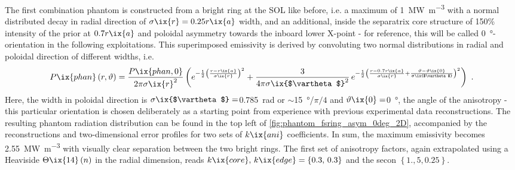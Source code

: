 %
                The first combination phantom is constructed from a bright ring at the SOL like before, i.e. a maximum of \SI{1}{\mega\watt\per\cubic\meter} with a normal distributed decay in radial direction of $\sigma\ix{r}=0.25r\ix{a}$ width, and an additional, inside the separatrix core structure of 150\% intensity of the prior at $0.7r\ix{a}$ and poloidal asymmetry towards the inboard lower X-point - for reference, this will be called \SI{0}{\degree}-orientation in the following exploitations. This superimposed emissivity is derived by convoluting two normal distributions in radial and poloidal direction of different widths, i.e.%
%
                \begin{align}%
                    P\ix{phan}\left(r,\vartheta\right)=%
                    \frac{P\ix{phan,0}}{2\pi\sigma\ix{r}^{2}}\left(%
                    e^{-\frac{1}{2}\left(\frac{r-r\ix{a}}{\sigma\ix{r}}\right)^{2}}+%
                    \frac{3}{4\pi\sigma\ix{$\vartheta$}^{2}}\,e^{-\frac{1}{2}\left(\frac{r-0.7r\ix{a}}{\sigma\ix{r}}+\frac{\vartheta-\vartheta\ix{0}}{\sigma\ix{$\vartheta$}}\right)^{2}}%
                    \right)\,\,.\label{eq:fsring_asym_single_deg}%
                \end{align}%
%
                Here, the width in poloidal direction is $\sigma\ix{$\vartheta$}=$\SI{0.785}{\radian} or $\sim$\SI{15}{\degree}/$
                \pi/4$ and $\vartheta\ix{0}=$\SI{0}{\degree}, the angle of the anisotropy - this particular orientation is chosen deliberately as a starting point from experience with previous experimental data reconstructions. The resulting phantom radiation distribution can be found in the top left of \cref{fig:phantom_fsring_asym_0deg_2D}, accompanied by the reconstructions and two-dimensional error profiles for two sets of $k\ix{ani}$ coefficients. In sum, the maximum emissivity becomes \SI{2.55}{\mega\watt\per\cubic\meter} with visually clear separation between the two bright rings. The first set of anisotropy factors, again extrapolated using a Heaviside $\Theta\ix{14}\left(n\right)$ in the radial dimension, reads $k\ix{core},\,k\ix{edge}=\left\{0.3,\,0.3\right\}$ and the secon $\left\{1.,5, 0.25\right\}$.\\%
